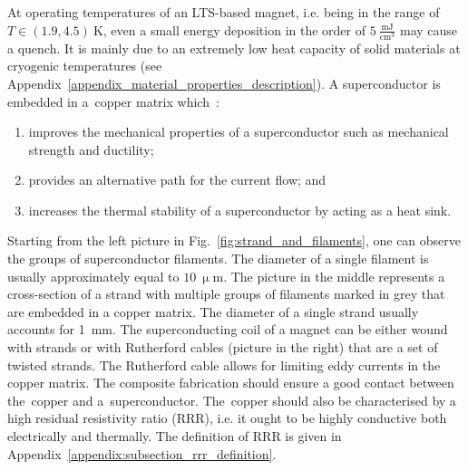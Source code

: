 At operating temperatures of an LTS-based magnet, i.e. being in the range of $T \in (1.9, 4.5)~\text{K}$, even a small energy deposition in the order of $5~\frac{\text{mJ}}{\text{cm}^3}$ may cause a quench. It is mainly due to an extremely low heat capacity of solid materials at cryogenic temperatures (see Appendix~\ref{appendix_material_properties_description}). A superconductor is embedded in a~copper matrix which~\cite[p.~31-33]{superconducting_accelerator_magnets}:

\begin{enumerate}
    \item improves the mechanical properties of a superconductor such as mechanical strength and ductility;
    \item provides an alternative path for the current flow; and
    \item increases the thermal stability of a superconductor by acting as a heat sink. 
\end{enumerate}

Starting from the left picture in Fig.~\ref{fig:strand_and_filaments}, one can observe the groups of superconductor filaments. The diameter of a single filament is usually approximately equal to $10~\upmu$m. The picture in the middle represents a cross-section of a strand with multiple groups of filaments marked in grey that are embedded in a copper matrix. The diameter of a single strand usually accounts for 1~mm. The superconducting coil of a magnet can be either wound with strands or with Rutherford cables (picture in the right) that are a set of twisted strands. The Rutherford cable allows for limiting eddy currents in the copper matrix. The composite fabrication should ensure a good contact between the~copper and a~superconductor. The~copper should also be characterised by a high residual resistivity ratio (RRR), i.e. it ought to be highly conductive both electrically and thermally. The definition of RRR is given in Appendix~\ref{appendix:subsection_rrr_definition}.~\cite[p.~31-33]{superconducting_accelerator_magnets}

